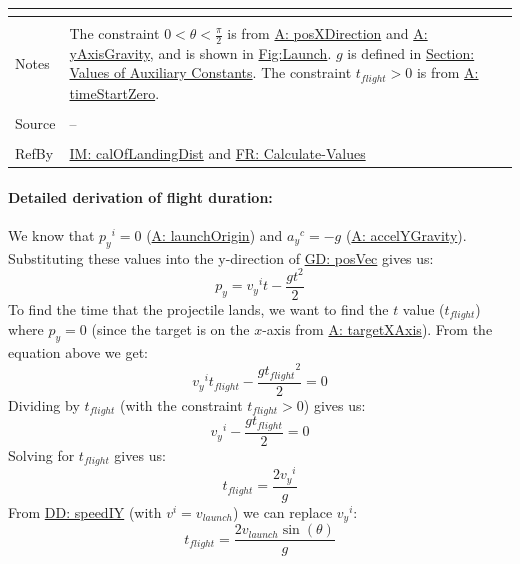 \documentclass[12pt]{article}
\begin{document}
\begin{minipage}{\textwidth}
\begin{tabular}{>{\raggedright}p{}>{\raggedright\arraybackslash}p{}}
\begin{symbDescription}
                        \end{symbDescription}
          \\ \midrule \\
          Notes & The constraint $0<θ<\frac{π}{2}$ is from \hyperref[posXDirection]{A: posXDirection} and \hyperref[yAxisGravity]{A: yAxisGravity}, and is shown in \hyperref[Figure:Launch]{Fig:Launch}.
                  $g$ is defined in \hyperref[Sec:AuxConstants]{Section: Values of Auxiliary Constants}.
                  The constraint ${t_{flight}}>0$ is from \hyperref[timeStartZero]{A: timeStartZero}.
          \\ \midrule \\
          Source & --
          \\ \midrule \\
          RefBy & \hyperref[IM:calOfLandingDist]{IM: calOfLandingDist} and \hyperref[calcValues]{FR: Calculate-Values}
          \\ \bottomrule
          \end{tabular}
          \end{minipage}
\paragraph{Detailed derivation of flight duration:}
\label{IM:calOfLandingTimeDeriv}
We know that ${{p_{y}}^{i}}=0$ (\hyperref[launchOrigin]{A: launchOrigin}) and ${{a_{y}}^{c}}=-g$ (\hyperref[accelYGravity]{A: accelYGravity}). Substituting these values into the y-direction of \hyperref[GD:posVec]{GD: posVec} gives us:
\begin{displaymath}
{p_{y}}={{v_{y}}^{i}} t-\frac{g t^{2}}{2}
\end{displaymath}
To find the time that the projectile lands, we want to find the $t$ value (${t_{flight}}$) where ${p_{y}}=0$ (since the target is on the $x$-axis from \hyperref[targetXAxis]{A: targetXAxis}). From the equation above we get:
\begin{displaymath}
{{v_{y}}^{i}} {t_{flight}}-\frac{g {t_{flight}}^{2}}{2}=0
\end{displaymath}
Dividing by ${t_{flight}}$ (with the constraint ${t_{flight}}>0$) gives us:
\begin{displaymath}
{{v_{y}}^{i}}-\frac{g {t_{flight}}}{2}=0
\end{displaymath}
Solving for ${t_{flight}}$ gives us:
\begin{displaymath}
{t_{flight}}=\frac{2 {{v_{y}}^{i}}}{g}
\end{displaymath}
From \hyperref[DD:speedIY]{DD: speedIY} (with ${v^{i}}={v_{launch}}$) we can replace ${{v_{y}}^{i}}$:
\begin{displaymath}
{t_{flight}}=\frac{2 {v_{launch}} \sin\left(θ\right)}{g}
\end{displaymath}
\par~
\end{document}
